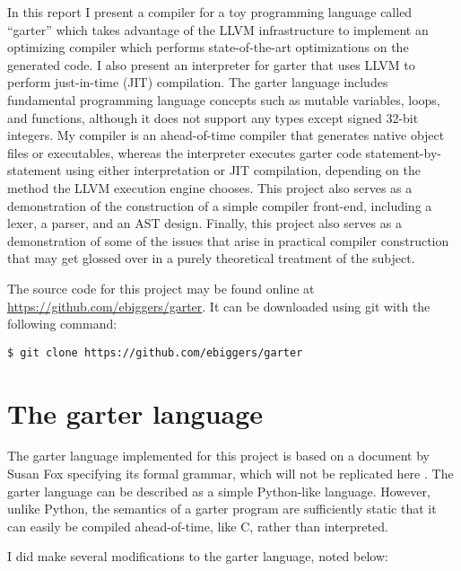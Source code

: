 \documentclass[11pt]{article}
\begin{document}
In this report I present a compiler for a toy programming language called
``garter'' which takes advantage of the LLVM infrastructure to implement an
optimizing compiler which performs state-of-the-art optimizations on the
generated code.  I also present an interpreter for garter that uses LLVM to
perform just-in-time (JIT) compilation.  The garter language includes
fundamental programming language concepts such as mutable variables, loops, and
functions, although it does not support any types except signed 32-bit integers.
My compiler is an ahead-of-time compiler that generates native object files or
executables, whereas the interpreter executes garter code statement-by-statement
using either interpretation or JIT compilation, depending on the method the LLVM
execution engine chooses.  This project also serves as a demonstration of the
construction of a simple compiler front-end, including a lexer, a parser, and an
AST design.  Finally, this project also serves as a demonstration of some of the
issues that arise in practical compiler construction that may get glossed over
in a purely theoretical treatment of the subject.

The source code for this project may be found online at
\url{https://github.com/ebiggers/garter}.  It can be downloaded using git with
the following command:

\begin{verbatim}
$ git clone https://github.com/ebiggers/garter
\end{verbatim}

\section{The garter language}

The garter language implemented for this project is based on a document by Susan
Fox specifying its formal grammar, which will not be replicated here
\cite{garter}.  The garter language can be described as a simple Python-like
language.  However, unlike Python, the semantics of a garter program are
sufficiently static that it can easily be compiled ahead-of-time, like C, rather
than interpreted.

I did make several modifications to the garter language, noted below:
\end{document}
